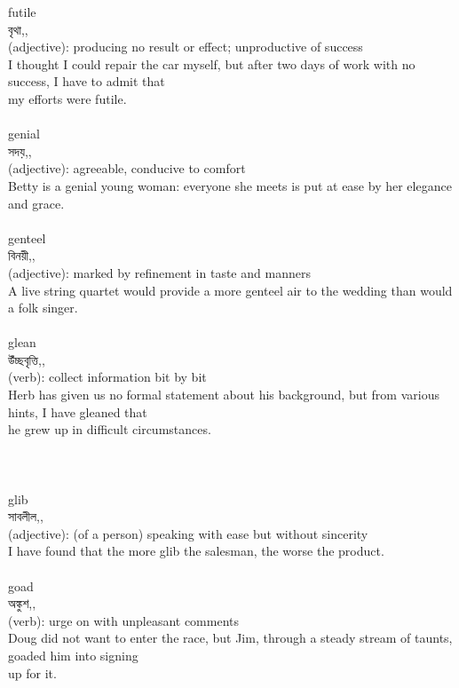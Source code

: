 \documentclass{article}
\begin{document}
{futile}\\
{বৃথা,,}\\
{(adjective): producing no result or effect; unproductive of success\\I thought I could repair the car myself, but after two days of work with no success, I have to admit that\\my efforts were futile.\\}\\
{genial}\\
{সদয়,,}\\
{(adjective): agreeable, conducive to comfort\\Betty is a genial young woman: everyone she meets is put at ease by her elegance and grace.\\}\\
{genteel}\\
{বিনয়ী,,}\\
{(adjective): marked by refinement in taste and manners\\A live string quartet would provide a more genteel air to the wedding than would a folk singer.\\}\\
{glean}\\
{উঁচ্ছবৃত্তি,,}\\
{(verb): collect information bit by bit\\Herb has given us no formal statement about his background, but from various hints, I have gleaned that\\he grew up in difficult circumstances.\\\\                                                                               \\}\\
{glib}\\
{সাবলীল,,}\\
{(adjective): (of a person) speaking with ease but without sincerity\\I have found that the more glib the salesman, the worse the product.\\}\\
{goad}\\
{অঙ্কুশ,,}\\
{(verb): urge on with unpleasant comments\\Doug did not want to enter the race, but Jim, through a steady stream of taunts, goaded him into signing\\up for it.\\}\\
\end{document}
